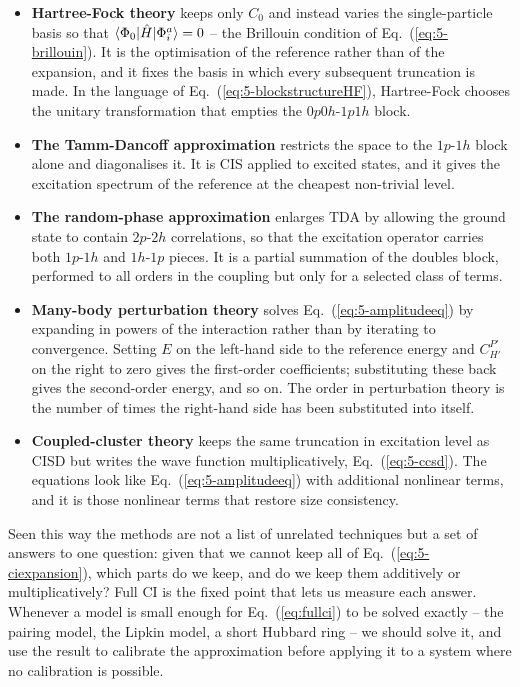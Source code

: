 \begin{itemize}
  \item \textbf{Hartree-Fock theory} keeps only $C_0$ and instead varies the
    single-particle basis so that $\langle \Phi_0 | \hat{H} | \Phi_i^a \rangle=0$ --
    the Brillouin condition of Eq.~(\ref{eq:5-brillouin}).  It is the
    optimisation of the reference rather than of the expansion, and it fixes
    the basis in which every subsequent truncation is made.  In the language
    of Eq.~(\ref{eq:5-blockstructureHF}), Hartree-Fock chooses the unitary
    transformation that empties the $0p0h$-$1p1h$ block.
  \item \textbf{The Tamm-Dancoff approximation} restricts the space to the
    $1p$-$1h$ block alone and diagonalises it.  It is CIS applied to excited
    states, and it gives the excitation spectrum of the reference at the
    cheapest non-trivial level.
  \item \textbf{The random-phase approximation} enlarges TDA by allowing the
    ground state to contain $2p$-$2h$ correlations, so that the excitation
    operator carries both $1p$-$1h$ and $1h$-$1p$ pieces.  It is a partial
    summation of the doubles block, performed to all orders in the coupling
    but only for a selected class of terms.
  \item \textbf{Many-body perturbation theory} solves
    Eq.~(\ref{eq:5-amplitudeeq}) by expanding in powers of the interaction
    rather than by iterating to convergence.  Setting $E$ on the left-hand
    side to the reference energy and $C_{H'}^{P'}$ on the right to zero gives
    the first-order coefficients; substituting these back gives the
    second-order energy, and so on.  The order in perturbation theory is the
    number of times the right-hand side has been substituted into itself.
  \item \textbf{Coupled-cluster theory} keeps the same truncation in
    excitation level as CISD but writes the wave function multiplicatively,
    Eq.~(\ref{eq:5-ccsd}).  The equations look like
    Eq.~(\ref{eq:5-amplitudeeq}) with additional nonlinear terms, and it is
    those nonlinear terms that restore size consistency.
\end{itemize}

Seen this way the methods are not a list of unrelated techniques but a set of
answers to one question: given that we cannot keep all of
Eq.~(\ref{eq:5-ciexpansion}), which parts do we keep, and do we keep them
additively or multiplicatively?  Full CI is the fixed point that lets us
measure each answer.  Whenever a model is small enough for
Eq.~(\ref{eq:fullci}) to be solved exactly -- the pairing model, the Lipkin
model, a short Hubbard ring -- we should solve it, and use the result to
calibrate the approximation before applying it to a system where no
calibration is possible.


